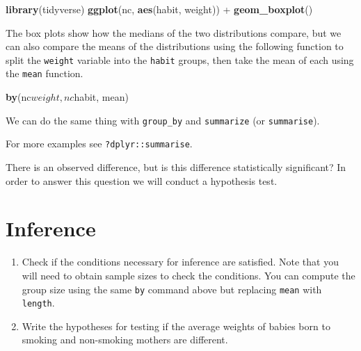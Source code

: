\documentclass[]{book}
\newenvironment{Shaded}{\begin{snugshade}}{\end{snugshade}}
\newcommand{\KeywordTok}[1]{\textcolor[rgb]{0.13,0.29,0.53}{\textbf{{#1}}}}
\newcommand{\DataTypeTok}[1]{\textcolor[rgb]{0.13,0.29,0.53}{{#1}}}
\newcommand{\StringTok}[1]{\textcolor[rgb]{0.31,0.60,0.02}{{#1}}}
\newcommand{\NormalTok}[1]{{#1}}
\theoremstyle{definition}
\theoremstyle{definition}
\theoremstyle{remark}
\begin{document}
\begin{Shaded}
\begin{Highlighting}[]
\KeywordTok{library}\NormalTok{(tidyverse)}
\KeywordTok{ggplot}\NormalTok{(nc, }\KeywordTok{aes}\NormalTok{(habit, weight)) +}\StringTok{ }\KeywordTok{geom_boxplot}\NormalTok{()}
\end{Highlighting}
\end{Shaded}

The box plots show how the medians of the two distributions compare, but
we can also compare the means of the distributions using the following
function to split the \texttt{weight} variable into the \texttt{habit}
groups, then take the mean of each using the \texttt{mean} function.

\begin{Shaded}
\begin{Highlighting}[]
\KeywordTok{by}\NormalTok{(nc$weight, nc$habit, mean)}
\end{Highlighting}
\end{Shaded}

We can do the same thing with \texttt{group\_by} and \texttt{summarize}
(or \texttt{summarise}).

\begin{Shaded}
\end{Shaded}

For more examples see \texttt{?dplyr::summarise}.

There is an observed difference, but is this difference statistically
significant? In order to answer this question we will conduct a
hypothesis test.

\hypertarget{inference}{\section*{Inference}\label{inference}}

\begin{enumerate}
\def\labelenumi{\arabic{enumi}.}
\setcounter{enumi}{2}
\item
  Check if the conditions necessary for inference are satisfied. Note
  that you will need to obtain sample sizes to check the conditions. You
  can compute the group size using the same \texttt{by} command above
  but replacing \texttt{mean} with \texttt{length}.
\item
  Write the hypotheses for testing if the average weights of babies born
  to smoking and non-smoking mothers are different.
\end{enumerate}
\end{document}
